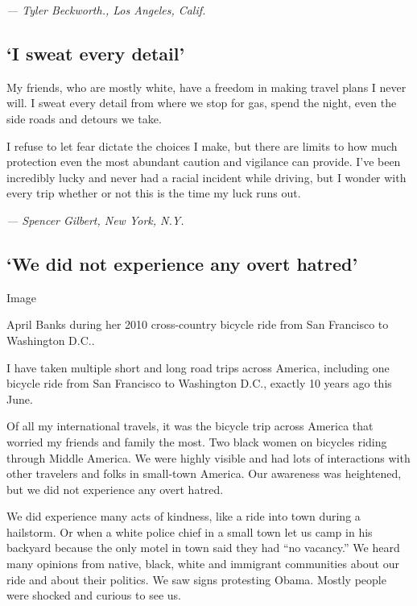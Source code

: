 \emph{--- Tyler Beckworth., Los Angeles, Calif.}

\hypertarget{i-sweat-every-detail}{%
\subsection{`I sweat every detail'}\label{i-sweat-every-detail}}

My friends, who are mostly white, have a freedom in making travel plans
I never will. I sweat every detail from where we stop for gas, spend the
night, even the side roads and detours we take.

I refuse to let fear dictate the choices I make, but there are limits to
how much protection even the most abundant caution and vigilance can
provide. I've been incredibly lucky and never had a racial incident
while driving, but I wonder with every trip whether or not this is the
time my luck runs out.

\emph{--- Spencer Gilbert, New York, N.Y.}

\hypertarget{we-did-not-experience-any-overt-hatred}{%
\subsection{`We did not experience any overt
hatred'}\label{we-did-not-experience-any-overt-hatred}}

Image

April Banks during her 2010 cross-country bicycle ride from San
Francisco to Washington D.C..

I have taken multiple short and long road trips across America,
including one bicycle ride from San Francisco to Washington D.C.,
exactly 10 years ago this June.

Of all my international travels, it was the bicycle trip across America
that worried my friends and family the most. Two black women on bicycles
riding through Middle America. We were highly visible and had lots of
interactions with other travelers and folks in small-town America. Our
awareness was heightened, but we did not experience any overt hatred.

We did experience many acts of kindness, like a ride into town during a
hailstorm. Or when a white police chief in a small town let us camp in
his backyard because the only motel in town said they had ``no
vacancy.'' We heard many opinions from native, black, white and
immigrant communities about our ride and about their politics. We saw
signs protesting Obama. Mostly people were shocked and curious to see
us.

